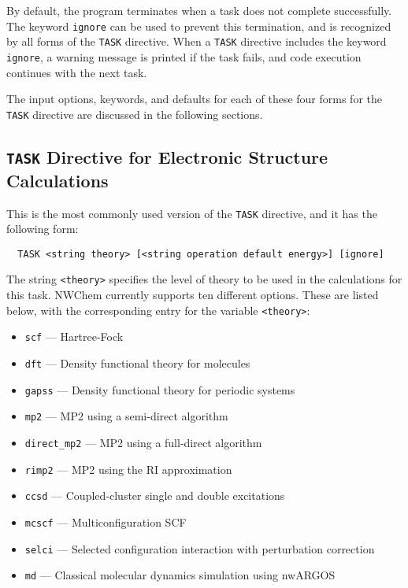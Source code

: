 By default, the program terminates when a task does not complete
successfully.  The keyword \verb+ignore+ can be used to prevent this
termination, and is recognized by all forms of the \verb+TASK+
directive.  When a \verb+TASK+ directive includes the keyword
\verb+ignore+, a warning message is printed if the task fails, and
code execution continues with the next task.

The input options, keywords, and defaults for each of these four forms
for the \verb+TASK+ directive are discussed in the following sections.

\subsection{{\tt TASK} Directive for Electronic Structure Calculations}
\label{sec:first_task}

This is the most commonly used version of the \verb+TASK+ directive, and
it has the following form:

\begin{verbatim}
  TASK <string theory> [<string operation default energy>] [ignore]
\end{verbatim}

The string \verb+<theory>+ specifies the level of theory to be used in the
calculations for this task.  NWChem currently supports ten different
options.  These are listed below, with the corresponding entry for 
the variable {\tt <theory>}:
\begin{itemize}
 \item \verb+scf+ --- Hartree-Fock
 \item \verb+dft+ --- Density functional theory for molecules
 \item \verb+gapss+ --- Density functional theory for periodic systems
 \item \verb+mp2+ --- MP2 using a semi-direct algorithm
 \item \verb+direct_mp2+ --- MP2 using a full-direct algorithm
 \item \verb+rimp2+ --- MP2 using the RI approximation
 \item \verb+ccsd+ --- Coupled-cluster single and double excitations
 \item \verb+mcscf+ --- Multiconfiguration SCF
 \item \verb+selci+ --- Selected configuration interaction with perturbation
   correction 
 \item \verb+md+ --- Classical molecular dynamics simulation using nwARGOS
\end{itemize}

